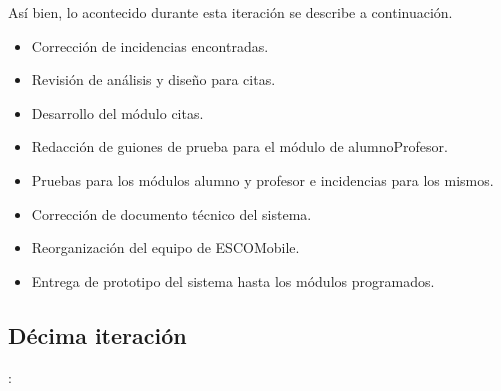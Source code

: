 \newline
Así bien, lo acontecido durante esta iteración se describe a continuación. 
\begin{itemize}
	\item Corrección de incidencias encontradas.
	\item Revisión de análisis y diseño para citas.
	\item Desarrollo del módulo citas.
	\item Redacción de guiones de prueba para el módulo de alumnoProfesor.
	\item Pruebas para los módulos alumno y profesor e incidencias para los mismos.
	\item Corrección de documento técnico del sistema.
	\item Reorganización del equipo de ESCOMobile.
	\item Entrega de prototipo del sistema hasta los módulos programados.
\end{itemize}


\subsection{Décima iteración}: 

